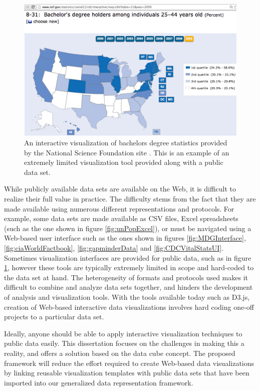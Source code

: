 \documentclass[12pt]{article}
\begin{document}
\begin{doublespace}
\begin{figure}[h!]
  \centering
  \includegraphics[width=\textwidth]{figures/nsfBachelorsDegrees.png}
  \caption[NSF Bachelors Degrees Statistics.]
    {An interactive visualization of bachelors degree statistics provided by the National Science Foundation site \cite{nsfBachelorsDegrees}. This is an example of an extremely limited visualization tool provided along with a public data set.}
  \label{fig:nsfBachelorsDegrees}
\end{figure}

While publicly available data sets are available on the Web, it is difficult to realize their full value in practice. The difficulty stems from the fact that they are made available using numerous different representations and protocols. For example, some data sets are made available as CSV files, Excel spreadsheets (such as the one shown in figure \ref{fig:unPopExcel}), or must be navigated using a Web-based user interface such as the ones shown in figures \ref{fig:MDGInterface}, \ref{fig:ciaWorldFactbook}, \ref{fig:gapminderData} and \ref{fig:CDCVitalStatsUI}. Sometimes visualization interfaces are provided for public data, such as in figure \ref{fig:nsfBachelorsDegrees}, however these tools are typically extremely limited in scope and hard-coded to the data set at hand. The heterogeneity of formats and protocols used makes it difficult to combine and analyze data sets together, and hinders the development of analysis and visualization tools. With the tools available today such as D3.js, creation of Web-based interactive data visualizations involves hard coding one-off projects to a particular data set.

Ideally, anyone should be able to apply interactive visualization techniques to public data easily. This dissertation focuses on the challenges in making this a reality, and offers a solution based on the data cube concept. The proposed framework will reduce the effort required to create Web-based data visualizations by linking reusable visualization templates with public data sets that have been imported into our generalized data representation framework.


\end{doublespace}
\end{document}
